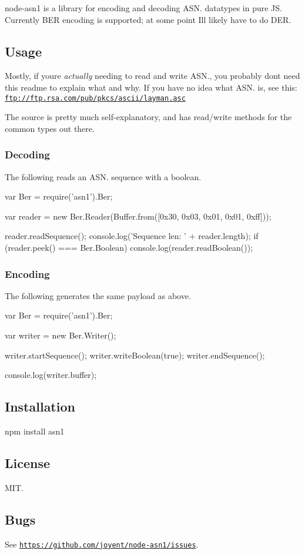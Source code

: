 node-\/asn1 is a library for encoding and decoding A\+S\+N. datatypes in pure JS. Currently B\+ER encoding is supported; at some point I\textquotesingle{}ll likely have to do D\+ER.

\subsection*{Usage}

Mostly, if you\textquotesingle{}re {\itshape actually} needing to read and write A\+S\+N., you probably don\textquotesingle{}t need this readme to explain what and why. If you have no idea what A\+S\+N. is, see this\+: \href{ftp://ftp.rsa.com/pub/pkcs/ascii/layman.asc}{\tt ftp\+://ftp.\+rsa.\+com/pub/pkcs/ascii/layman.\+asc}

The source is pretty much self-\/explanatory, and has read/write methods for the common types out there.

\subsubsection*{Decoding}

The following reads an A\+S\+N. sequence with a boolean. \begin{DoxyVerb}var Ber = require('asn1').Ber;

var reader = new Ber.Reader(Buffer.from([0x30, 0x03, 0x01, 0x01, 0xff]));

reader.readSequence();
console.log('Sequence len: ' + reader.length);
if (reader.peek() === Ber.Boolean)
  console.log(reader.readBoolean());
\end{DoxyVerb}


\subsubsection*{Encoding}

The following generates the same payload as above. \begin{DoxyVerb}var Ber = require('asn1').Ber;

var writer = new Ber.Writer();

writer.startSequence();
writer.writeBoolean(true);
writer.endSequence();

console.log(writer.buffer);
\end{DoxyVerb}


\subsection*{Installation}

\begin{DoxyVerb}npm install asn1
\end{DoxyVerb}


\subsection*{License}

M\+IT.

\subsection*{Bugs}

See \href{https://github.com/joyent/node-asn1/issues}{\tt https\+://github.\+com/joyent/node-\/asn1/issues}. 